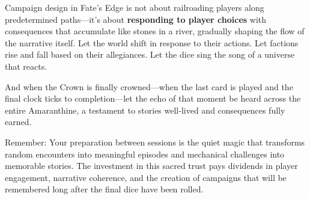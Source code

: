 Campaign design in Fate's Edge is not about railroading players along predetermined paths—it's about \textbf{responding to player choices} with consequences that accumulate like stones in a river, gradually shaping the flow of the narrative itself. Let the world shift in response to their actions. Let factions rise and fall based on their allegiances. Let the dice sing the song of a universe that reacts.

And when the Crown is finally crowned—when the last card is played and the final clock ticks to completion—let the echo of that moment be heard across the entire Amaranthine, a testament to stories well‑lived and consequences fully earned.

Remember: Your preparation between sessions is the quiet magic that transforms random encounters into meaningful episodes and mechanical challenges into memorable stories. The investment in this sacred trust pays dividends in player engagement, narrative coherence, and the creation of campaigns that will be remembered long after the final dice have been rolled.

\endinput